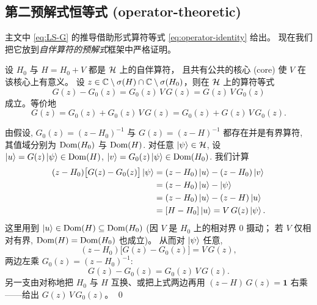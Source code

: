 \subsection{第二预解式恒等式 (operator-theoretic)}

主文中 \eqref{eq:LS-G} 的推导借助形式算符等式 \eqref{eq:operator-identity} 给出。
现在我们把它放到\emph{自伴算符的预解式}框架中严格证明。

\begin{theorem}
\label{thm:G-second-resolvent}
设 $H_0$ 与 $H=H_0+V$ 都是 $\mathcal{H}$ 上的自伴算符，
且共有公共的核心 (core) 使 $V$ 在该核心上有意义。
设 $z\in\mathbb{C}\setminus\sigma(H)\cap\mathbb{C}\setminus\sigma(H_0)$，则在 $\mathcal{H}$ 上的算符等式
\begin{equation}\label{eq:G-2nd-resolvent}
  G(z) - G_0(z) = G_0(z)\,V\,G(z) = G(z)\,V\,G_0(z)
\end{equation}
成立。等价地
\begin{equation}\label{eq:G-2nd-resolvent-LS}
  G(z) = G_0(z) + G_0(z)\,V\,G(z) = G_0(z) + G(z)\,V\,G_0(z).
\end{equation}
\end{theorem}

\begin{proof*}
由假设, $G_0(z)=(z-H_0)^{-1}$ 与 $G(z)=(z-H)^{-1}$ 都存在并是有界算符,
其值域分别为 $\operatorname{Dom}(H_0)$ 与 $\operatorname{Dom}(H)$.
对任意 $\ket\psi\in\mathcal{H}$, 设 $\ket{u}=G(z)\ket\psi\in\operatorname{Dom}(H)$,
$\ket v=G_0(z)\ket\psi\in\operatorname{Dom}(H_0)$. 我们计算
\begin{align}
  (z-H_0)\bigl[G(z)-G_0(z)\bigr]\ket\psi
  &= (z-H_0)\ket u - (z-H_0)\ket v\notag\\
  &= (z-H_0)\ket u - \ket\psi\notag\\
  &= (z-H_0)\ket u - (z-H)\ket u\notag\\
  &= [H-H_0]\ket u = V\,G(z)\ket\psi.
\end{align}
这里用到 $\ket u\in\operatorname{Dom}(H)\subseteq\operatorname{Dom}(H_0)$ (因 $V$ 是 $H_0$ 上的相对界 0 摄动；
若 $V$ 仅相对有界, $\operatorname{Dom}(H)=\operatorname{Dom}(H_0)$ 也成立)。
从而对 $\ket\psi$ 任意,
\begin{equation}
  (z-H_0)\bigl[G(z)-G_0(z)\bigr] = V\,G(z),
\end{equation}
两边左乘 $G_0(z)=(z-H_0)^{-1}$:
\begin{equation}
  G(z)-G_0(z) = G_0(z)\,V\,G(z).
\end{equation}
另一支由对称地把 $H_0$ 与 $H$ 互换、或把上式两边再用
$(z-H)\,G(z)=\mathbf 1$ 右乘——给出 $G(z)\,V\,G_0(z)$。
\qed
\end{proof*}

